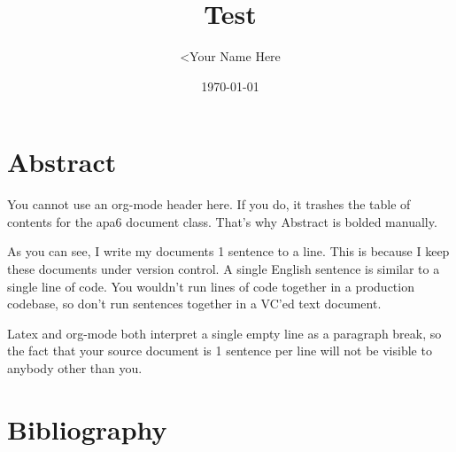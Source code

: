 \documentclass[11pt]{article}
\author{<Your Name Here}
\date{\today}
\title{Test}
\begin{document}
\maketitle
\tableofcontents




\section{Abstract}
\label{sec:org7e80c82}

You cannot use an org-mode header here.
If you do, it trashes the table of contents for the apa6 document class.
That's why Abstract is bolded manually.

As you can see, I write my documents 1 sentence to a line.
This is because I keep these documents under version control.
A single English sentence is similar to a single line of code.
You wouldn't run lines of code together in a production codebase, so don't run sentences together in a VC'ed text document.

Latex and org-mode both interpret a single empty line as a paragraph break, so the fact that your source document is 1 sentence per line will not be visible to anybody other than you.

\cite{devlin2019}
\section{Bibliography}
\label{sec:orgfd13368}

\end{document}
